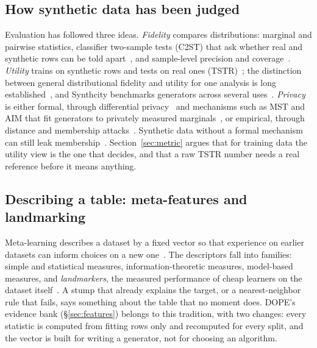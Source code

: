\documentclass[10pt,letterpaper,twocolumn]{article}
\begin{document}
\subsection{How synthetic data has been judged}
Evaluation has followed three ideas. \emph{Fidelity} compares distributions: marginal and pairwise statistics, classifier two-sample tests (C2ST) that ask whether real and synthetic rows can be told apart~\cite{lopezpaz2017c2st}, and sample-level precision and coverage~\cite{alaa2022faithful}. \emph{Utility} trains on synthetic rows and tests on real ones (TSTR)~\cite{esteban2017tstr}; the distinction between general distributional fidelity and utility for one analysis is long established~\cite{snoke2018utility}, and Synthcity benchmarks generators across several uses~\cite{qian2023synthcity}. \emph{Privacy} is either formal, through differential privacy~\cite{dwork2006calibrating} and mechanisms such as MST and AIM that fit generators to privately measured marginals~\cite{mckenna2021mst,mckenna2022aim}, or empirical, through distance and membership attacks~\cite{shokri2017membership}. Synthetic data without a formal mechanism can still leak membership~\cite{stadler2022groundhog}. Section~\ref{sec:metric} argues that for training data the utility view is the one that decides, and that a raw TSTR number needs a real reference before it means anything.

\subsection{Describing a table: meta-features and landmarking}
Meta-learning describes a dataset by a fixed vector so that experience on earlier datasets can inform choices on a new one~\cite{vanschoren2018metalearning}. The descriptors fall into families: simple and statistical measures, information-theoretic measures, model-based measures, and \emph{landmarkers}, the measured performance of cheap learners on the dataset itself~\cite{pfahringer2000landmarking,rivolli2022metafeatures}. A stump that already explains the target, or a nearest-neighbor rule that fails, says something about the table that no moment does. DOPE's evidence bank (\S\ref{sec:features}) belongs to this tradition, with two changes: every statistic is computed from fitting rows only and recomputed for every split, and the vector is built for writing a generator, not for choosing an algorithm.
\end{document}
